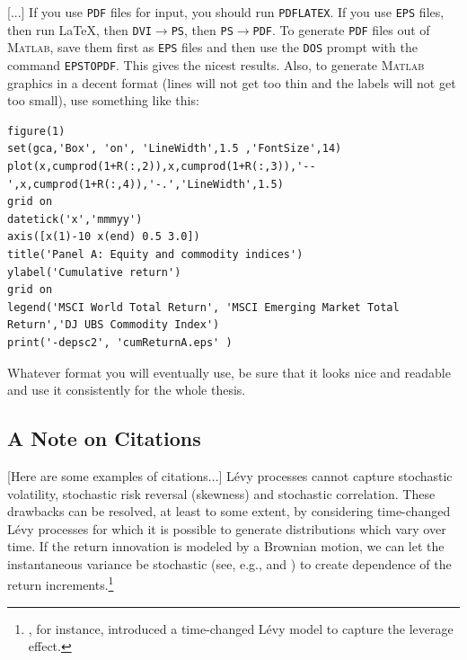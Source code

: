 \documentclass[11pt,a4paper,english,oneside]{book}
\numberwithin{equation}{chapter}
\begin{document}
[...] If you use \texttt{PDF} files for input, you should run \texttt{PDFLATEX}. If you use \texttt{EPS} files, then run \LaTeX, then \texttt{DVI}$\rightarrow$\texttt{PS}, then \texttt{PS}$\rightarrow$\texttt{PDF}. To generate \texttt{PDF} files out of \textsc{Matlab}, save them first as \texttt{EPS} files and then use the \texttt{DOS} prompt with the command \texttt{EPSTOPDF}. This gives the nicest results. Also, to generate \textsc{Matlab} graphics in a decent format (lines will not get too thin and the labels will not get too small), use something like this:
\begin{lstlisting}
figure(1)
set(gca,'Box', 'on', 'LineWidth',1.5 ,'FontSize',14)
plot(x,cumprod(1+R(:,2)),x,cumprod(1+R(:,3)),'--',x,cumprod(1+R(:,4)),'-.','LineWidth',1.5)
grid on
datetick('x','mmmyy')
axis([x(1)-10 x(end) 0.5 3.0])
title('Panel A: Equity and commodity indices')
ylabel('Cumulative return')
grid on
legend('MSCI World Total Return', 'MSCI Emerging Market Total Return','DJ UBS Commodity Index')
print('-depsc2', 'cumReturnA.eps' )
\end{lstlisting}

Whatever format you will eventually use, be sure that it looks nice and readable and use it consistently for the whole thesis.


\subsection{A Note on Citations}

[Here are some examples of citations...] Lévy processes cannot capture stochastic volatility, stochastic risk reversal (skewness) and stochastic correlation. These drawbacks can be resolved, at least to some extent, by considering time-changed Lévy processes for which it is possible to generate distributions which vary over time. If the return innovation is modeled by a Brownian motion, we can let the instantaneous variance be stochastic (see, e.g., \cite{SH1993} and \cite{BA1996}) to create dependence of the return increments.\footnote{\cite{CW2004}, for instance, introduced a time-changed Lévy model to capture the leverage effect.}





\newpage

\appendix
\noappendicestocpagenum
\addappheadtotoc
\appendixpage



\renewcommand{\theequation}{A.\arabic{equation}}
\end{document}
